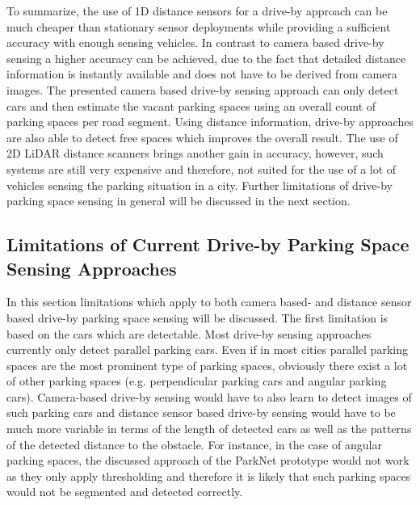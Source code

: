 To summarize, the use of 1D distance sensors for a drive-by approach can be much cheaper than stationary sensor deployments while providing a sufficient accuracy with enough sensing vehicles. In contrast to camera based drive-by sensing a higher accuracy can be achieved, due to the fact that detailed distance information is  instantly available and does not have to be derived from camera images. The presented camera based drive-by sensing approach can only detect cars and then estimate the vacant parking spaces using an overall count of parking spaces per road segment. Using distance information, drive-by approaches are also able to detect free spaces which improves the overall result. The use of 2D LiDAR distance scanners brings another gain in accuracy, however, such systems are still very expensive and therefore, not suited for the use of a lot of vehicles sensing the parking situation in a city. Further limitations of drive-by parking space sensing in general will be discussed in the next section.


\subsection{Limitations of Current Drive-by Parking Space Sensing Approaches}
\label{sec:limitations_driveby_sensing}

In this section limitations which apply to both camera based- and distance sensor based drive-by parking space sensing will be discussed. The first limitation is based on the cars which are detectable. Most drive-by sensing approaches currently only detect parallel parking cars. Even if in most cities parallel parking spaces are the most prominent type of parking spaces, obviously there exist a lot of other parking spaces (e.g. perpendicular parking cars and angular parking cars). Camera-based drive-by sensing would have to also learn to detect images of such parking cars and distance sensor based drive-by sensing would have to be much more variable in terms of the length of detected cars as well as the patterns of the detected distance to the obstacle. For instance, in the case of angular parking spaces, the discussed approach of the ParkNet prototype would not work as they only apply thresholding and therefore it is likely that such parking spaces would not be segmented and detected correctly.

